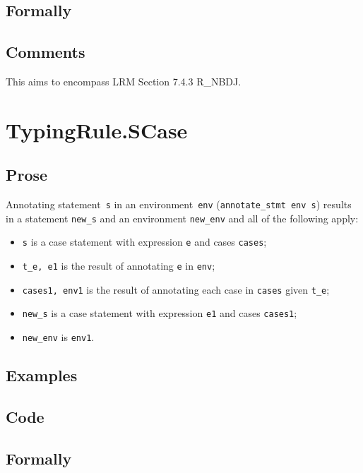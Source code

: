 \documentclass{book}
\begin{document}
  \subsection{Formally}

  \subsection{Comments}
    This aims to encompass LRM Section 7.4.3 R\_NBDJ.

\section{TypingRule.SCase \label{sec:TypingRule.SCase}}

  \subsection{Prose}
Annotating statement~\texttt{s} in an environment~\texttt{env}
(\texttt{annotate\_stmt env s}) results in a statement \texttt{new\_s} and an
environment \texttt{new\_env} and all of the following apply:
   \begin{itemize}
   \item \texttt{s} is a case statement with expression \texttt{e} and cases \texttt{cases};
   \item \texttt{t\_e, e1} is the result of annotating \texttt{e} in \texttt{env};
   \item \texttt{cases1, env1} is the result of annotating each case in \texttt{cases} given \texttt{t\_e};
   \item \texttt{new\_s} is a case statement with expression \texttt{e1} and cases \texttt{cases1};
   \item \texttt{new\_env} is \texttt{env1}.
   \end{itemize}

  \subsection{Examples}

  \subsection{Code}

  \subsection{Formally}
\end{document}
